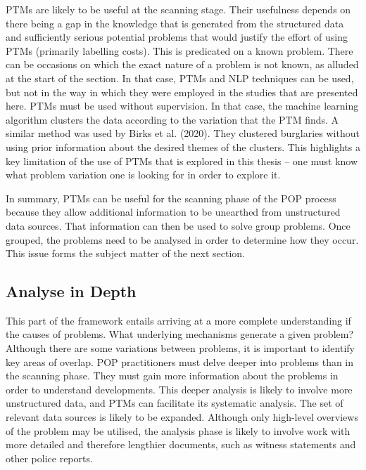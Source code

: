 PTMs are likely to be useful at the scanning stage. Their usefulness depends on there being a gap in the knowledge that is generated from the structured data and sufficiently serious potential problems that would justify the effort of using PTMs (primarily labelling costs). This is predicated on a known problem. There can be occasions on which the exact nature of a problem is not known, as alluded at the start of the section. In that case, PTMs and NLP techniques can be used, but not in the way in which they were employed in the studies that are presented here. PTMs must be used without supervision. In that case, the machine learning algorithm clusters the data according to the variation that the PTM finds. A similar method was used by Birks et al. (2020). They clustered burglaries without using prior information about the desired themes of the clusters. This highlights a key limitation of the use of PTMs that is explored in this thesis – one must know what problem variation one is looking for in order to explore it.

In summary, PTMs can be useful for the scanning phase of the POP process because they allow additional information to be unearthed from unstructured data sources. That information can then be used to solve group problems. Once grouped, the problems need to be analysed in order to determine how they occur. This issue forms the subject matter of the next section.


\subsection{Analyse in Depth} This part of the framework entails arriving at a more complete understanding if the causes of problems. What underlying mechanisms generate a given problem? Although there are some variations between problems, it is important to identify key areas of overlap. POP practitioners must delve deeper into problems than in the scanning phase. They must gain more information about the problems in order to understand developments. This deeper analysis is likely to involve more unstructured data, and PTMs can facilitate its systematic analysis. The set of relevant data sources is likely to be expanded. Although only high-level overviews of the problem may be utilised, the analysis phase is likely to involve work with more detailed and therefore lengthier documents, such as witness statements and other police reports.

